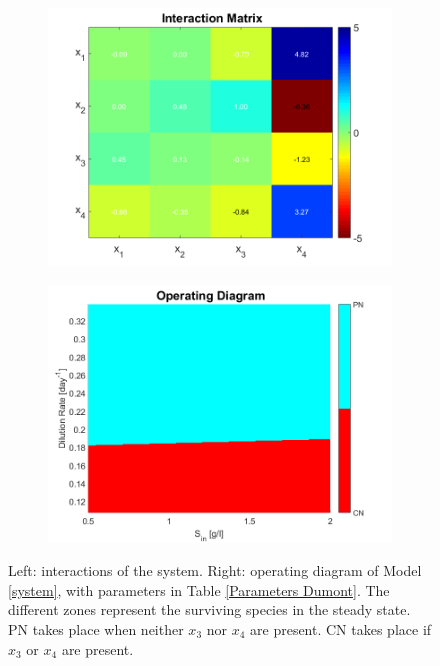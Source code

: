 \documentclass[3p,times]{elsarticle}
\begin{document}
\begin{figure}[ht]
	\centering
	\begin{subfigure}[b]{0.45\textwidth}
		\includegraphics[width=\textwidth]{Interactions_Parameters_Dumont}
	\end{subfigure}
	\begin{subfigure}[b]{0.45\textwidth}
	\includegraphics[width=\textwidth]{OD_parameters_Dumont}
	\end{subfigure}
	\caption{Left: interactions of the system. Right: operating diagram of Model \eqref{system}, with parameters in Table \ref{Parameters Dumont}. The different zones represent the surviving species in the steady state. PN takes place when neither $x_3$ nor $x_4$ are present. CN takes place if $x_3$ or $x_4$ are present.}
	\label{OD Dumont}
\end{figure}
\end{document}
